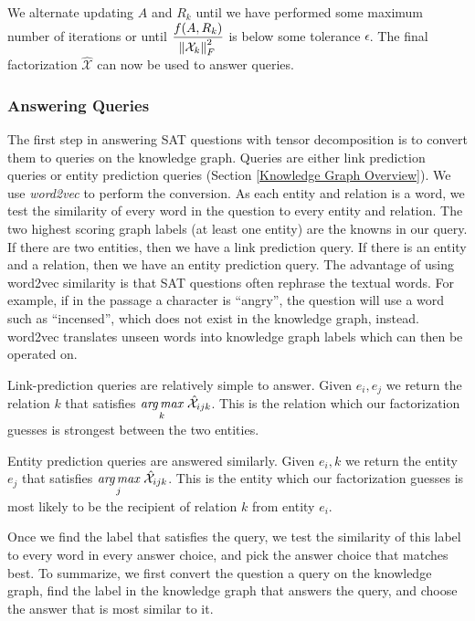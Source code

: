 \documentclass[pageno]{final_paper}
\begin{document}
We alternate updating $A$ and $R_k$ until we have performed some maximum number
of iterations or until $\dfrac{f(A, R_k)}{\norm{\mathcal{X}_k}_F^2}$ is below
some tolerance $\epsilon$. The final factorization $\hat{\mathcal{X}}$ can now
be used to answer queries.

\subsubsection{Answering Queries}
\label{Answering Queries}

The first step in answering SAT questions with tensor decomposition is to
convert them to queries on the knowledge graph. Queries are either link
prediction queries or entity prediction queries (Section \ref{Knowledge Graph
Overview}). We use \textit{word2vec} to perform the conversion. As each entity
and relation is a word, we test the similarity of every word in the question to
every entity and relation. The two highest scoring graph labels (at least one
entity) are the knowns in our query. If there are two entities, then we have a
link prediction query. If there is an entity and a relation, then we have an
entity prediction query. The advantage of using word2vec similarity is that SAT
questions often rephrase the textual words. For example, if in the passage a
character is ``angry'', the question will use a word such as ``incensed'', which
does not exist in the knowledge graph, instead. word2vec translates unseen words
into  knowledge graph labels which can then be operated on.

Link-prediction queries are relatively simple to answer. Given $e_i, e_j$ we
return the relation $k$ that satisfies $\underset{k}{{\textit{arg}}\,{\textit{max}}}\,\, \hat{\mathcal{X}}_{ijk}$.
This is the relation which our factorization guesses is strongest between the
two entities.

Entity prediction queries are answered similarly. Given $e_i, k$ we return the
entity $e_j$ that satisfies $\underset{j}{{\textit{arg}}\,{\textit{max}}}\,\, \hat{\mathcal{X}}_{ijk}$. This is
the entity which our factorization guesses is most likely to be the recipient of
relation $k$ from entity $e_i$.

Once we find the label that satisfies the query, we test the similarity of this
label to every word in every answer choice, and pick the answer choice that
matches best. To summarize, we first convert the question a query on the
knowledge graph, find the label in the knowledge graph that answers the query,
and choose the answer that is most similar to it.
\end{document}
